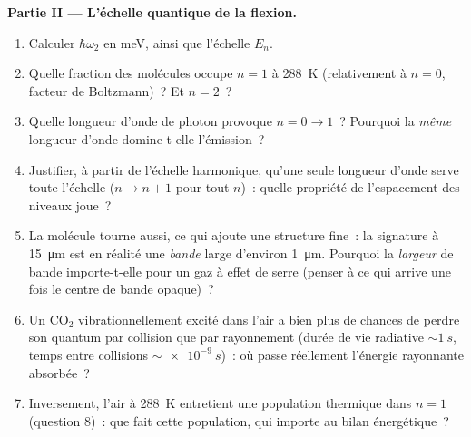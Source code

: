 \begin{problem}
\medskip\noindent\textbf{Partie II --- L'échelle quantique de la flexion.}
\begin{enumerate}[resume]
  \item Calculer $\hbar\omega_2$ en meV, ainsi que l'échelle $E_n$.
  \item Quelle fraction des molécules occupe $n = 1$ à \qty{288}{K}
        (relativement à $n = 0$, facteur de Boltzmann)~? Et $n = 2$~?
  \item Quelle longueur d'onde de photon provoque $n = 0 \to 1$~?
        Pourquoi la \emph{même} longueur d'onde domine-t-elle
        l'émission~?
  \item Justifier, à partir de l'échelle harmonique, qu'une seule
        longueur d'onde serve toute l'échelle ($n \to n + 1$ pour tout
        $n$)~: quelle propriété de l'espacement des niveaux joue~?
  \item La molécule tourne aussi, ce qui ajoute une structure fine~:
        la signature à \qty{15}{\micro m} est en réalité une
        \emph{bande} large d'environ \qty{1}{\micro m}. Pourquoi la
        \emph{largeur} de bande importe-t-elle pour un gaz à effet de
        serre (penser à ce qui arrive une fois le centre de bande
        opaque)~?
  \item Un CO$_2$ vibrationnellement excité dans l'air a bien plus de
        chances de perdre son quantum par collision que par
        rayonnement (durée de vie radiative $\sim\qty{1}{s}$, temps
        entre collisions $\sim\qty{e-9}{s}$)~: où passe réellement
        l'énergie rayonnante absorbée~?
  \item Inversement, l'air à \qty{288}{K} entretient une population
        thermique dans $n = 1$ (question 8)~: que fait cette
        population, qui importe au bilan énergétique~?
\end{enumerate}


\end{problem}
